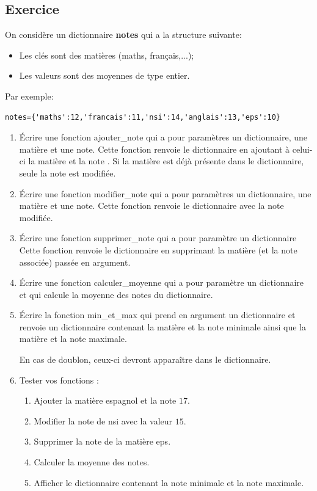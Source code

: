 \documentclass[11pt,a4paper]{article}
\newcounter{numexo}
\begin{document}
\subsection*{\Large Exercice \thenumexo}
On considère un dictionnaire \textbf{notes} qui a la structure suivante:
\begin{itemize}[label=\textbullet]
\item Les clés sont des matières (maths, français,...);
\item Les valeurs sont des moyennes de type entier.
\end{itemize}
Par exemple:
\begin{lstlisting}
notes={'maths':12,'francais':11,'nsi':14,'anglais':13,'eps':10}
\end{lstlisting}
\begin{enumerate}
\item Écrire une fonction \textsf{ajouter\_note} qui a pour paramètres un dictionnaire, une matière et une note. Cette fonction renvoie le dictionnaire en ajoutant à celui-ci la matière et la note . Si la matière est déjà présente dans le dictionnaire, seule la note est modifiée.

\item Écrire une fonction \textsf{modifier\_note} qui a pour paramètres un dictionnaire, une matière et une note. Cette fonction  renvoie le dictionnaire avec la note modifiée.

\item Écrire une fonction \textsf{supprimer\_note} qui a pour paramètre un dictionnaire Cette fonction renvoie le dictionnaire en supprimant la matière (et la note associée) passée en argument.

\item Écrire une fonction \textsf{calculer\_moyenne} qui a pour paramètre un dictionnaire et qui calcule la moyenne des notes du dictionnaire.

\item Écrire la fonction \textsf{min\_et\_max} qui prend en argument un dictionnaire et renvoie un dictionnaire contenant la matière et la note minimale ainsi que la matière et la note maximale. 

En cas de doublon, ceux-ci devront apparaître dans le dictionnaire.

\item Tester vos fonctions :
\begin{enumerate}
\item Ajouter la matière \textsf{espagnol} et la note $17$.
\item Modifier la note de \textsf{nsi} avec la valeur $15$.
\item Supprimer la note de la matière \textsf{eps}.
\item Calculer la moyenne des notes.
\item Afficher le dictionnaire contenant la note minimale et la note maximale.
\end{enumerate}
\end{enumerate}
\end{document}
